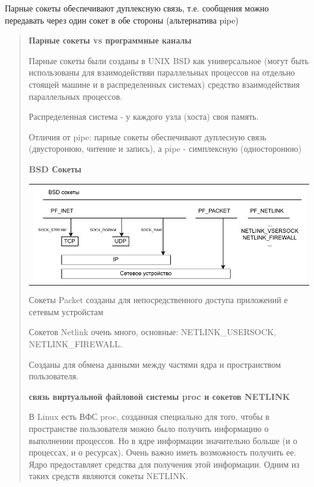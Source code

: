 Парные сокеты обеспечивают дуплексную связь, т.е. сообщения можно передавать через один сокет в обе стороны (альтернатива pipe)

\begin{quote}
	\textbf{Парные сокеты vs программные каналы}

  Парные сокеты были созданы в UNIX BSD как универсальное (могут быть использованы для взаимодействяи параллельных процессов на отдельно стоящей машине и в распределенных системах) средство взаимодействия параллельных процессов.

  Распределенная система - у каждого узла (хоста) своя память.

  Отличия от pipe: парные сокеты обеспечивают дуплесную связь (двусторонюю, читение и запись), а pipe - симплексную (односторонюю)

  \textbf{BSD Сокеты}

  \begin{table}[H]
  \centering
  \begin{tabular}{p{1\linewidth}}
    \centering
    \includegraphics[width=0.8\linewidth]{./images/8-2.pdf}
  \end{tabular}
\end{table}

  Сокеты Packet созданы для непосредственного доступа приложений е сетевым устройстам

  Сокетов Netlink очень много, основные: NETLINK\_USERSOCK, NETLINK\_FIREWALL.

  Созданы для обмена данными между частями ядра и пространством пользователя.

  \textbf{связь виртуальной файловой системы proc и сокетов NETLINK}

  В Linux есть ВФС proc, созданная специально для того, чтобы в пространстве пользователя можно было получить информацию о выполнении процессов. Но в ядре информации значительно больше (и о процессах, и о ресурсах). Очень важно иметь возможность получить ее. Ядро предоставляет средства для получения этой информации. Одним из таких средств являются сокеты NETLINK.
\end{quote}

